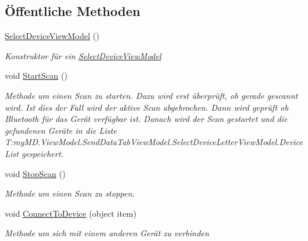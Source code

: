 \subsection*{Öffentliche Methoden}
\begin{DoxyCompactItemize}
\item 
\mbox{\hyperlink{classmy_m_d_1_1_view_model_1_1_send_data_tab_view_model_1_1_select_device_view_model_a39d908572f42325912210144d3614d66}{Select\+Device\+View\+Model}} ()
\begin{DoxyCompactList}\small\item\em Konstruktor für ein \mbox{\hyperlink{classmy_m_d_1_1_view_model_1_1_send_data_tab_view_model_1_1_select_device_view_model}{Select\+Device\+View\+Model}} \end{DoxyCompactList}\item 
void \mbox{\hyperlink{classmy_m_d_1_1_view_model_1_1_send_data_tab_view_model_1_1_select_device_view_model_aa20931acf9e9c3580019a5025d2f1abb}{Start\+Scan}} ()
\begin{DoxyCompactList}\small\item\em Methode um einen Scan zu starten. Dazu wird erst überprüft, ob gerade gescannt wird. Ist dies der Fall wird der aktive Scan abgebrochen. Dann wird geprüft ob Bluetooth für das Gerät verfügbar ist. Danach wird der Scan gestartet und die gefundenen Geräte in die Liste T\+:my\+M\+D.\+View\+Model.\+Send\+Data\+Tab\+View\+Model.\+Select\+Device\+Letter\+View\+Model.\+Device\+List gespeichert. \end{DoxyCompactList}\item 
void \mbox{\hyperlink{classmy_m_d_1_1_view_model_1_1_send_data_tab_view_model_1_1_select_device_view_model_adfca7bb7ef30bb64e2247bcdff75f654}{Stop\+Scan}} ()
\begin{DoxyCompactList}\small\item\em Methode um einen Scan zu stoppen. \end{DoxyCompactList}\item 
void \mbox{\hyperlink{classmy_m_d_1_1_view_model_1_1_send_data_tab_view_model_1_1_select_device_view_model_a04c544486f732bddac2d5feded4193a1}{Connect\+To\+Device}} (object item)
\begin{DoxyCompactList}\small\item\em Methode um sich mit einem anderen Gerät zu verbinden \end{DoxyCompactList}\end{DoxyCompactItemize}
